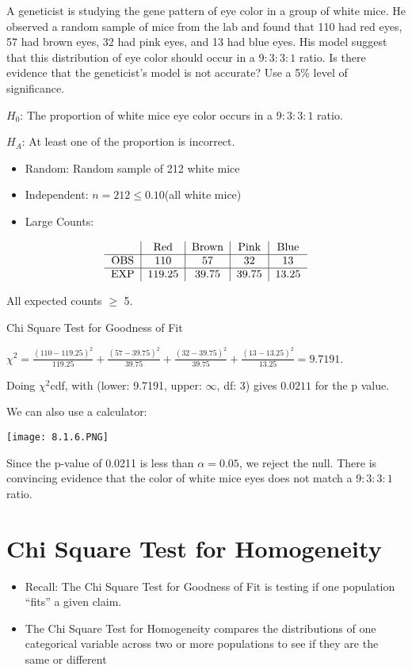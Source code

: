 \documentclass[../stats.tex]{subfiles}
\begin{document}
\pagebreak
\begin{example}
    A geneticist is studying the gene pattern of eye color in a group of white mice. He observed a random sample of mice from the lab and found that 110 had red eyes, 57 had brown eyes, 32 had pink eyes, and 13 had blue eyes. His model suggest that this distribution of eye color should occur in a $9:3:3:1$ ratio. Is there evidence that the geneticist's model is not accurate? Use a 5\% level of significance.

    $H_0$: The proportion of white mice eye color occurs in a $9:3:3:1$ ratio.

    $H_A$: At least one of the proportion is incorrect.

    \begin{itemize}
        \item Random: Random sample of 212 white mice 
        \item Independent: $n=212\leq 0.10$(all white mice)
        \item Large Counts:
    \end{itemize}\medbreak
    \[ \begin{tabular}{c|c|c|c|c}
        & Red & Brown & Pink & Blue \\ \hline 
        OBS & 110 & 57 & 32 & 13\\\hline 
        EXP & 119.25 & 39.75 & 39.75 & 13.25
    \end{tabular}\]

    All expected counts $\geq$ 5.

    Chi Square Test for Goodness of Fit 

    $\chi^2 = \frac{(110-119.25)^2}{119.25}+\frac{(57-39.75)^2}{39.75}+\frac{(32-39.75)^2}{39.75}+\frac{(13-13.25)^2}{13.25}=9.7191$.

    Doing $\chi^2$cdf, with (lower: 9.7191, upper: $\infty$, df: 3) gives $0.0211$ for the p value.

    We can also use a calculator:
    \begin{center}
        \texttt{[image: 8.1.6.PNG]}
    \end{center}

    Since the p-value of 0.0211 is less than $\alpha=0.05$, we reject the null. There is convincing evidence that the color of white mice eyes does not match a $9:3:3:1$ ratio.
\end{example}


\section{Chi Square Test for Homogeneity}
\begin{itemize}
    \item Recall: The Chi Square Test for Goodness of Fit is testing if one population ``fits'' a given claim.
    \item The Chi Square Test for Homogeneity compares the distributions of one categorical variable across two or more populations to see if they are the same or different 
\end{itemize}
\end{document}
